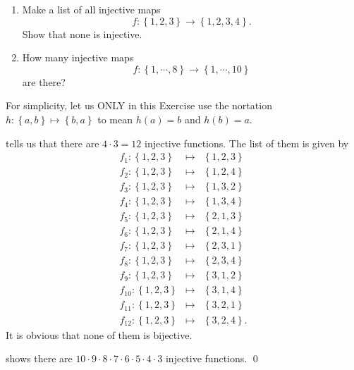 \documentclass[a4paper,12pt]{article}
\begin{document}
\begin{exe}\leavevmode \par
	\begin{enumerate}
		\item
		      Make a list of all injective maps
		      \begin{equation*}
			      f:\left\{ 1,2,3 \right\} \to \left\{ 1,2,3,4 \right\}.
		      \end{equation*}
		      Show that none is injective.
		      
		\item
		      How many injective maps
		      \begin{equation*}
			      f:\left\{ 1,\cdots,8 \right\} \to \left\{ 1,\cdots,10 \right\}
		      \end{equation*}
		      are there?
	\end{enumerate}
	
\end{exe}\begin{sol}\leavevmode \par
	For simplicity,
	let us ONLY in this Exercise use the nortation
	\( h:\left\{ a,b \right\} \mapsto \left\{ b,a\right\}\)
	to mean
	\( h(a)=b \)
	and
	\( h(b)=a \).
	
	 tells us that there are
	\( 4 \cdot 3 = 12\) injective functions.
	The list of them is given by
	\begin{eqnarray*}
		f_{1}:\left\{1,2,3 \right\} &\mapsto& \left\{1,2,3  \right\}\\
		f_{2}:\left\{1,2,3 \right\} &\mapsto& \left\{ 1,2,4 \right\}\\
		f_{3}:\left\{1,2,3 \right\} &\mapsto& \left\{ 1,3,2 \right\}\\
		f_{4}:\left\{1,2,3 \right\} &\mapsto& \left\{ 1,3,4 \right\}\\
		f_{5}:\left\{1,2,3 \right\} &\mapsto& \left\{ 2,1,3 \right\}\\
		f_{6}:\left\{1,2,3 \right\} &\mapsto& \left\{ 2,1,4 \right\}\\
		f_{7}:\left\{1,2,3 \right\} &\mapsto& \left\{ 2,3,1 \right\}\\
		f_{8}:\left\{1,2,3 \right\} &\mapsto& \left\{ 2,3,4 \right\}\\
		f_{9}:\left\{1,2,3 \right\} &\mapsto& \left\{ 3,1,2 \right\}\\
		f_{10}:\left\{1,2,3 \right\} &\mapsto& \left\{ 3,1,4 \right\}\\
		f_{11}:\left\{1,2,3 \right\} &\mapsto& \left\{ 3,2,1 \right\}\\
		f_{12}:\left\{1,2,3 \right\} &\mapsto& \left\{ 3,2,4 \right\}.
	\end{eqnarray*}
	It is obvious that none of them is bijective.
	
	 shows there are
	\( 10 \cdot 9 \cdot 8\cdot 7 \cdot 6 \cdot 5 \cdot 4\cdot 3 \)
	injective functions.
	\qed\end{sol}
\end{document}
